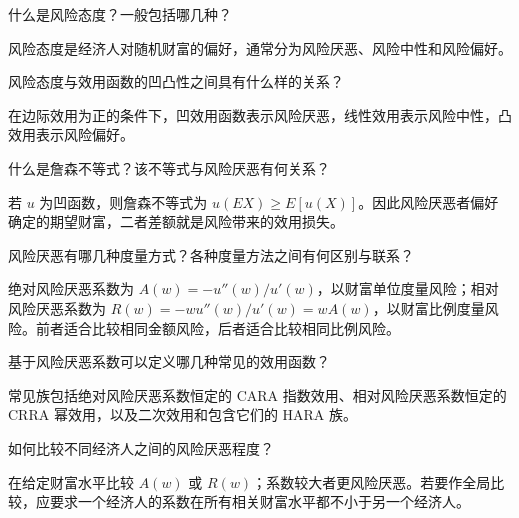 
\begin{problem}
 什么是风险态度？一般包括哪几种？
\end{problem}
\begin{solution}
风险态度是经济人对随机财富的偏好，通常分为风险厌恶、风险中性和风险偏好。
\end{solution}
\begin{problem}
 风险态度与效用函数的凹凸性之间具有什么样的关系？
\end{problem}
\begin{solution}
在边际效用为正的条件下，凹效用函数表示风险厌恶，线性效用表示风险中性，凸效用表示风险偏好。
\end{solution}
\begin{problem}
 什么是詹森不等式？该不等式与风险厌恶有何关系？
\end{problem}
\begin{solution}
若 $u$ 为凹函数，则詹森不等式为 $u(E X)\ge E[u(X)]$。因此风险厌恶者偏好确定的期望财富，二者差额就是风险带来的效用损失。
\end{solution}
\begin{problem}
 风险厌恶有哪几种度量方式？各种度量方法之间有何区别与联系？
\end{problem}
\begin{solution}
绝对风险厌恶系数为 $A(w)=-u''(w)/u'(w)$，以财富单位度量风险；相对风险厌恶系数为 $R(w)=-wu''(w)/u'(w)=wA(w)$，以财富比例度量风险。前者适合比较相同金额风险，后者适合比较相同比例风险。
\end{solution}
\begin{problem}
 基于风险厌恶系数可以定义哪几种常见的效用函数？
\end{problem}
\begin{solution}
常见族包括绝对风险厌恶系数恒定的 CARA 指数效用、相对风险厌恶系数恒定的 CRRA 幂效用，以及二次效用和包含它们的 HARA 族。
\end{solution}
\begin{problem}
 如何比较不同经济人之间的风险厌恶程度？
\end{problem}
\begin{solution}
在给定财富水平比较 $A(w)$ 或 $R(w)$；系数较大者更风险厌恶。若要作全局比较，应要求一个经济人的系数在所有相关财富水平都不小于另一个经济人。
\end{solution}

